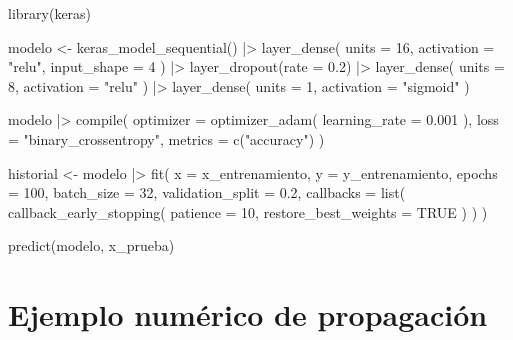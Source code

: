 \documentclass[
  spanish,
  10.5pt,
  letterpaper,
  DIV=11,
  numbers=noendperiod,
  oneside,
  open=any]{scrreprt}
\newenvironment{Shaded}{\begin{snugshade}}{\end{snugshade}}
\newcommand{\AttributeTok}[1]{\textcolor[rgb]{0.40,0.45,0.13}{#1}}
\newcommand{\ConstantTok}[1]{\textcolor[rgb]{0.56,0.35,0.01}{#1}}
\newcommand{\DecValTok}[1]{\textcolor[rgb]{0.68,0.00,0.00}{#1}}
\newcommand{\FloatTok}[1]{\textcolor[rgb]{0.68,0.00,0.00}{#1}}
\newcommand{\FunctionTok}[1]{\textcolor[rgb]{0.28,0.35,0.67}{#1}}
\newcommand{\NormalTok}[1]{\textcolor[rgb]{0.00,0.23,0.31}{#1}}
\newcommand{\OtherTok}[1]{\textcolor[rgb]{0.00,0.23,0.31}{#1}}
\newcommand{\SpecialCharTok}[1]{\textcolor[rgb]{0.37,0.37,0.37}{#1}}
\newcommand{\StringTok}[1]{\textcolor[rgb]{0.13,0.47,0.30}{#1}}
\theoremstyle{definition}
\theoremstyle{definition}
\theoremstyle{plain}
\theoremstyle{remark}
\begin{document}
\begin{Shaded}
\begin{Highlighting}[numbers=left,,]
\FunctionTok{library}\NormalTok{(keras)}

\NormalTok{modelo }\OtherTok{\textless{}{-}} \FunctionTok{keras\_model\_sequential}\NormalTok{() }\SpecialCharTok{|\textgreater{}}
  \FunctionTok{layer\_dense}\NormalTok{(}
    \AttributeTok{units =} \DecValTok{16}\NormalTok{,}
    \AttributeTok{activation =} \StringTok{"relu"}\NormalTok{,}
    \AttributeTok{input\_shape =} \DecValTok{4}
\NormalTok{  ) }\SpecialCharTok{|\textgreater{}}
  \FunctionTok{layer\_dropout}\NormalTok{(}\AttributeTok{rate =} \FloatTok{0.2}\NormalTok{) }\SpecialCharTok{|\textgreater{}}
  \FunctionTok{layer\_dense}\NormalTok{(}
    \AttributeTok{units =} \DecValTok{8}\NormalTok{,}
    \AttributeTok{activation =} \StringTok{"relu"}
\NormalTok{  ) }\SpecialCharTok{|\textgreater{}}
  \FunctionTok{layer\_dense}\NormalTok{(}
    \AttributeTok{units =} \DecValTok{1}\NormalTok{,}
    \AttributeTok{activation =} \StringTok{"sigmoid"}
\NormalTok{  )}

\NormalTok{modelo }\SpecialCharTok{|\textgreater{}}
  \FunctionTok{compile}\NormalTok{(}
    \AttributeTok{optimizer =} \FunctionTok{optimizer\_adam}\NormalTok{(}
      \AttributeTok{learning\_rate =} \FloatTok{0.001}
\NormalTok{    ),}
    \AttributeTok{loss =} \StringTok{"binary\_crossentropy"}\NormalTok{,}
    \AttributeTok{metrics =} \FunctionTok{c}\NormalTok{(}\StringTok{"accuracy"}\NormalTok{)}
\NormalTok{  )}

\NormalTok{historial }\OtherTok{\textless{}{-}}\NormalTok{ modelo }\SpecialCharTok{|\textgreater{}}
  \FunctionTok{fit}\NormalTok{(}
    \AttributeTok{x =}\NormalTok{ x\_entrenamiento,}
    \AttributeTok{y =}\NormalTok{ y\_entrenamiento,}
    \AttributeTok{epochs =} \DecValTok{100}\NormalTok{,}
    \AttributeTok{batch\_size =} \DecValTok{32}\NormalTok{,}
    \AttributeTok{validation\_split =} \FloatTok{0.2}\NormalTok{,}
    \AttributeTok{callbacks =} \FunctionTok{list}\NormalTok{(}
      \FunctionTok{callback\_early\_stopping}\NormalTok{(}
        \AttributeTok{patience =} \DecValTok{10}\NormalTok{,}
        \AttributeTok{restore\_best\_weights =} \ConstantTok{TRUE}
\NormalTok{      )}
\NormalTok{    )}
\NormalTok{  )}

\FunctionTok{predict}\NormalTok{(modelo, x\_prueba)}
\end{Highlighting}
\end{Shaded}

\section*{Ejemplo numérico de
propagación}\label{ejemplo-numuxe9rico-de-propagaciuxf3n}
\end{document}
